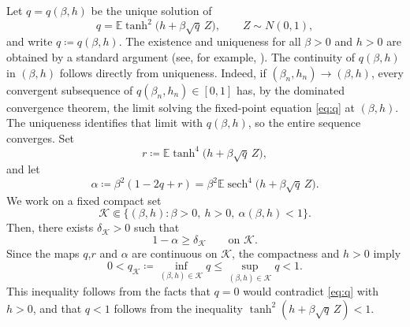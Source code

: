 \documentclass[11pt]{article}
\numberwithin{equation}{section}
\newcommand{\1}{\mathbf 1}
\newcommand{\sech}{\operatorname{sech}}
\newcommand{\cK}{\mathcal K}
\begin{document}
Let $q= q(\beta,h)$ be the unique solution of
\begin{equation}
 q=\mathbb{E}\tanh^2\bigl(h+\beta\sqrt q\,Z\bigr),
 \qquad Z\sim N(0,1),
 \label{eq:q}
\end{equation}
and write $q\coloneqq q(\beta,h)$.
The existence and uniqueness for all $\beta>0$ and  $h>0$ are obtained by a standard argument (see, for example, \cite[Proposition~1.3.8]{Talagrand}).
The continuity of $q(\beta ,h )$ in $(\beta , h)$ follows directly from  uniqueness.
Indeed, if $(\beta_n,h_n)\to(\beta,h)$, every convergent subsequence of $q(\beta_n,h_n)\in[0,1]$ has, by the dominated convergence theorem, the limit solving the fixed-point equation \eqref{eq:q} at $(\beta,h)$.
The uniqueness identifies that limit with $q(\beta,h)$, so
the entire sequence converges.
Set
\begin{equation}
 r\coloneqq\mathbb{E}\tanh^4\bigl(h+\beta\sqrt q\,Z\bigr),
 \label{eq:ra}
\end{equation}
and let
\begin{equation}
 \alpha\coloneqq\beta^2(1-2q+r)
 =\beta^2\mathbb{E}\sech^4\bigl(h+\beta\sqrt q\,Z\bigr).
 \label{eq:alpha}
\end{equation}
We work on a fixed compact set
\begin{equation}
 \cK\Subset\{(\beta,h):\beta>0,\ h>0,\ \alpha(\beta,h)<1\}.
 \label{eq:K}
\end{equation}
Then, there exists $\delta_{\cK}>0$ such that
\begin{equation}
 1-\alpha\ge\delta_{\cK}
 \qquad\text{on }\cK.
 \label{eq:delta}
\end{equation}
Since the maps $q$,$r$ and $\alpha$ are continuous on $\cK$, the compactness and $h>0$ imply
\begin{equation}
 0<q_{\cK}\coloneqq\inf_{(\beta,h)\in\cK}q
 \le \sup_{(\beta,h)\in\cK}q<1.
 \label{eq:qcompact}
\end{equation}
This inequality follows from the facts that $q=0$ would contradict \eqref{eq:q} with $h>0$, and that $q<1$ follows from the inequality $\tanh^2(h+\beta\sqrt q\,Z)<1$.
\end{document}
